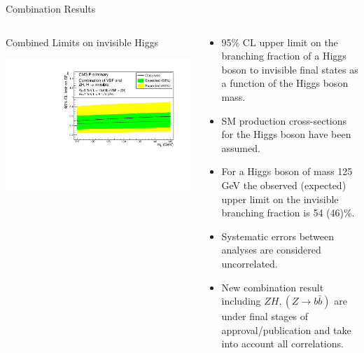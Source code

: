 \documentclass[8pt]{beamer}
\begin{document}
\begin{frame}{Combination Results}
  
\begin{columns}
 
\begin{block}{Combined Limits on invisible Higgs}
 
\centering
\includegraphics[width=\linewidth]{img/invlimitfinal.pdf} 

\end{block}

\begin{block}

\begin{itemize}
 \item 95\% CL upper limit on the branching fraction of a Higgs boson to invisible final states as a function of the Higgs boson mass.
 \item SM production cross-sections for the Higgs boson have been assumed.
 \item For a Higgs boson of mass 125 GeV the observed (expected) upper limit on the invisible branching fraction is 54 (46)\%.
 \item Systematic errors between analyses are considered uncorrelated.
 \item New combination result including $ZH, (Z \rightarrow b\bar{b})$ are under final stages of approval/publication and take into account all correlations.
\end{itemize}
 
\end{block}

\end{columns}
 
\end{frame}
\end{document}
